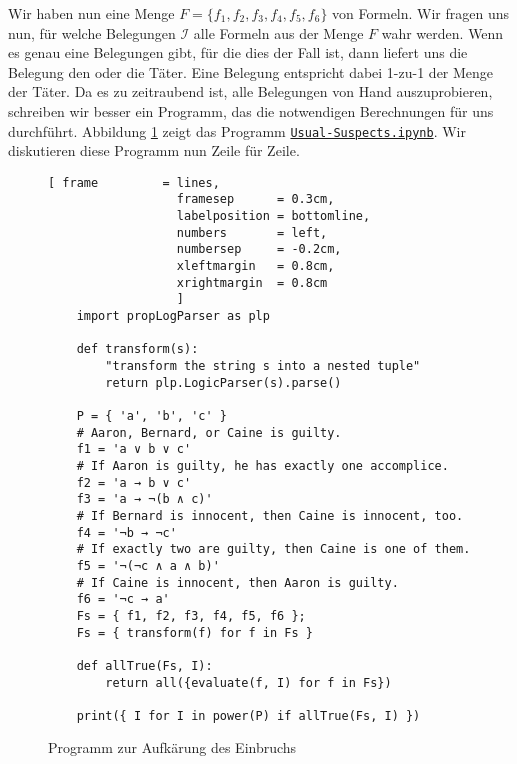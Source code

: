 Wir haben nun eine Menge $F = \{ f_1, f_2, f_3, f_4, f_5, f_6 \}$ von Formeln.
Wir fragen uns nun, für welche Belegungen $\mathcal{I}$ alle Formeln aus der Menge $F$ wahr werden.
Wenn es genau eine Belegungen gibt, für die dies der Fall ist, dann liefert uns die
Belegung den oder die Täter.  Eine Belegung entspricht dabei 1-zu-1 der Menge der Täter.
Da es zu zeitraubend ist, alle Belegungen von Hand auszuprobieren,
schreiben wir besser ein Programm, das die notwendigen Berechnungen für uns durchführt.
Abbildung \ref{fig:Usual-Suspects.ipynb} zeigt das Programm
\href{https://github.com/karlstroetmann/Logik/blob/master/Python/Usual-Suspects.ipynb}{\texttt{Usual-Suspects.ipynb}}.
Wir diskutieren diese Programm nun Zeile für Zeile.

\begin{figure}[!ht]
  \centering
\begin{Verbatim}[ frame         = lines, 
                  framesep      = 0.3cm, 
                  labelposition = bottomline,
                  numbers       = left,
                  numbersep     = -0.2cm,
                  xleftmargin   = 0.8cm,
                  xrightmargin  = 0.8cm
                  ]
    import propLogParser as plp

    def transform(s):
        "transform the string s into a nested tuple"
        return plp.LogicParser(s).parse()
    
    P = { 'a', 'b', 'c' }
    # Aaron, Bernard, or Caine is guilty.
    f1 = 'a ∨ b ∨ c'
    # If Aaron is guilty, he has exactly one accomplice.
    f2 = 'a → b ∨ c'
    f3 = 'a → ¬(b ∧ c)'
    # If Bernard is innocent, then Caine is innocent, too.
    f4 = '¬b → ¬c'
    # If exactly two are guilty, then Caine is one of them.
    f5 = '¬(¬c ∧ a ∧ b)'
    # If Caine is innocent, then Aaron is guilty.
    f6 = '¬c → a'
    Fs = { f1, f2, f3, f4, f5, f6 };
    Fs = { transform(f) for f in Fs }

    def allTrue(Fs, I):
        return all({evaluate(f, I) for f in Fs})

    print({ I for I in power(P) if allTrue(Fs, I) })
\end{Verbatim}
\vspace*{-0.3cm}
  \caption{Programm zur Aufkärung des Einbruchs}
  \label{fig:Usual-Suspects.ipynb}
\end{figure}

